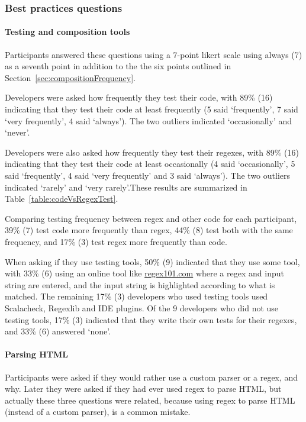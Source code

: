 

\subsubsection{Best practices questions}\label{sec:bestPractices}
\paragraph{Testing and composition tools} Participants answered these questions using a 7-point likert scale using always (7) as a seventh point in addition to the the six points outlined in Section~\ref{sec:compositionFrequency}.

Developers were asked how frequently they test their code, with 89\% (16) indicating that they test their code at least frequently (5 said `frequently', 7 said `very frequently', 4 said `always').  The two outliers indicated `occasionally' and `never'.

Developers were also asked how frequently they test their regexes, with 89\% (16) indicating that they test their code at least occasionally (4 said `occasionally', 5 said `frequently', 4 said `very frequently' and 3 said `always').  The two outliers indicated `rarely' and `very rarely'.These results are summarized in Table~\ref{table:codeVsRegexTest}.

Comparing testing frequency between regex and other code for each participant, 39\% (7) test code more frequently than regex, 44\% (8) test both with the same frequency, and 17\% (3) test regex more frequently than code.

When asking if they use testing tools, 50\% (9) indicated that they use some tool, with 33\% (6) using an online tool like \url{regex101.com} where a regex and input string are entered, and the input string is highlighted according to what is matched.  The remaining 17\% (3) developers who used testing tools used Scalacheck, Regexlib and IDE plugins.
Of the 9 developers who did not use testing tools, 17\% (3) indicated that they write their own tests for their regexes, and 33\% (6) answered `none'.

\paragraph{Parsing HTML} Participants were asked if they would rather use a custom parser or a regex, and why.  Later they were asked if they had ever used regex to parse HTML, but actually these three questions were related, because using regex to parse HTML (instead of a custom parser), is a common mistake.

